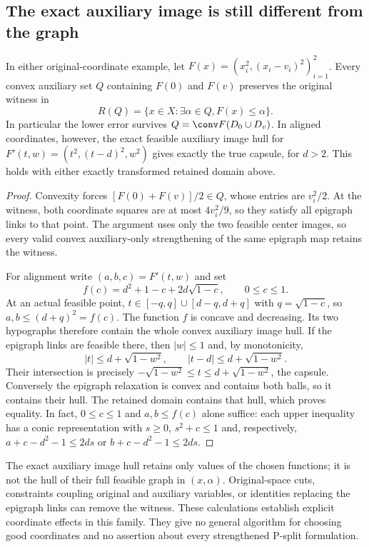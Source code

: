 \subsection{The exact auxiliary image is still different from the graph}
\begin{proposition}
\label{prop:psplit-exact-image}
In either original-coordinate example, let
$F(x)=(x_i^2,(x_i-v_i)^2)_{i=1}^2$. Every convex auxiliary set $Q$
containing $F(0)$ and $F(v)$ preserves the original witness in
\[
 R(Q)=\{x\in X:\exists\alpha\in Q,F(x)\le\alpha\}.
\]
In particular the lower error survives $Q=\conv F(D_0\cup D_v)$.
In aligned coordinates, however, the exact feasible auxiliary image hull
for $F'(t,w)=(t^2,(t-d)^2,w^2)$ gives exactly the true capsule, for $d>2$.
This holds with either exactly transformed retained domain above.
\end{proposition}
\begin{proof}
Convexity forces $[F(0)+F(v)]/2\in Q$, whose entries are $v_i^2/2$.
At the witness, both coordinate squares are at most $4v_i^2/9$, so they
satisfy all epigraph links to that point. The argument uses only the two
feasible center images, so every valid convex auxiliary-only
strengthening of the same epigraph map retains the witness.

For alignment write $(a,b,c)=F'(t,w)$ and set
\[
 f(c)=d^2+1-c+2d\sqrt{1-c},\qquad0\le c\le1.
\]
At an actual feasible point, $t\in[-q,q]\cup[d-q,d+q]$ with
$q=\sqrt{1-c}$, so $a,b\le(d+q)^2=f(c)$. The function $f$ is
concave and decreasing. Its two hypographs therefore contain the whole
convex auxiliary image hull. If the epigraph links are feasible there,
then $|w|\le1$ and, by monotonicity,
\[
 |t|\le d+\sqrt{1-w^2},\qquad |t-d|\le d+\sqrt{1-w^2}.
\]
Their intersection is precisely
$-\sqrt{1-w^2}\le t\le d+\sqrt{1-w^2}$, the capsule.
Conversely the epigraph relaxation is convex and contains both balls,
so it contains their hull. The retained domain contains that hull,
which proves equality. In fact, $0\le c\le1$ and $a,b\le f(c)$ alone
suffice: each upper inequality has a conic representation with
$s\ge0$, $s^2+c\le1$ and, respectively,
$a+c-d^2-1\le2ds$ or $b+c-d^2-1\le2ds$.
\end{proof}
The exact auxiliary image hull retains only values of the chosen functions;
it is not the hull of their full feasible graph in $(x,\alpha)$.
Original-space cuts, constraints coupling original and auxiliary variables,
or identities replacing the epigraph links can remove the witness.
These calculations establish explicit coordinate effects in this family.
They give no general algorithm for choosing good coordinates and no
assertion about every strengthened P-split formulation.
